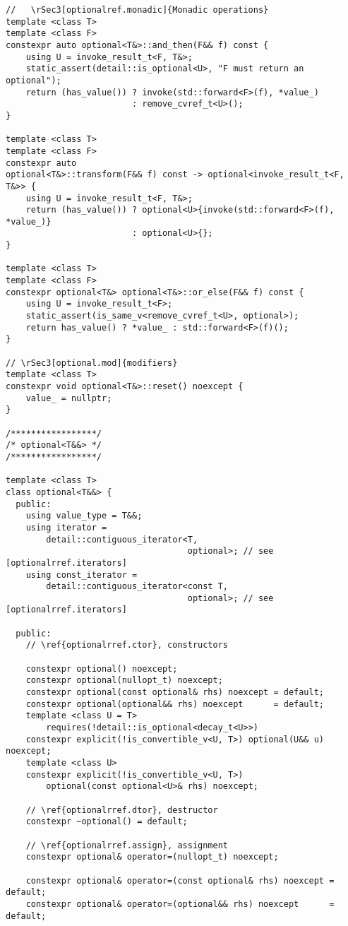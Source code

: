 \documentclass[a4paper,10pt,oneside,openany,final,article]{memoir}
\begin{document}
\begin{verbatim}
//   \rSec3[optionalref.monadic]{Monadic operations}
template <class T>
template <class F>
constexpr auto optional<T&>::and_then(F&& f) const {
    using U = invoke_result_t<F, T&>;
    static_assert(detail::is_optional<U>, "F must return an optional");
    return (has_value()) ? invoke(std::forward<F>(f), *value_)
                         : remove_cvref_t<U>();
}

template <class T>
template <class F>
constexpr auto
optional<T&>::transform(F&& f) const -> optional<invoke_result_t<F, T&>> {
    using U = invoke_result_t<F, T&>;
    return (has_value()) ? optional<U>{invoke(std::forward<F>(f), *value_)}
                         : optional<U>{};
}

template <class T>
template <class F>
constexpr optional<T&> optional<T&>::or_else(F&& f) const {
    using U = invoke_result_t<F>;
    static_assert(is_same_v<remove_cvref_t<U>, optional>);
    return has_value() ? *value_ : std::forward<F>(f)();
}

// \rSec3[optional.mod]{modifiers}
template <class T>
constexpr void optional<T&>::reset() noexcept {
    value_ = nullptr;
}

/*****************/
/* optional<T&&> */
/*****************/

template <class T>
class optional<T&&> {
  public:
    using value_type = T&&;
    using iterator =
        detail::contiguous_iterator<T,
                                    optional>; // see [optionalrref.iterators]
    using const_iterator =
        detail::contiguous_iterator<const T,
                                    optional>; // see [optionalrref.iterators]

  public:
    // \ref{optionalrref.ctor}, constructors

    constexpr optional() noexcept;
    constexpr optional(nullopt_t) noexcept;
    constexpr optional(const optional& rhs) noexcept = default;
    constexpr optional(optional&& rhs) noexcept      = default;
    template <class U = T>
        requires(!detail::is_optional<decay_t<U>>)
    constexpr explicit(!is_convertible_v<U, T>) optional(U&& u) noexcept;
    template <class U>
    constexpr explicit(!is_convertible_v<U, T>)
        optional(const optional<U>& rhs) noexcept;

    // \ref{optionalrref.dtor}, destructor
    constexpr ~optional() = default;

    // \ref{optionalrref.assign}, assignment
    constexpr optional& operator=(nullopt_t) noexcept;

    constexpr optional& operator=(const optional& rhs) noexcept = default;
    constexpr optional& operator=(optional&& rhs) noexcept      = default;


\end{verbatim}
\end{document}
